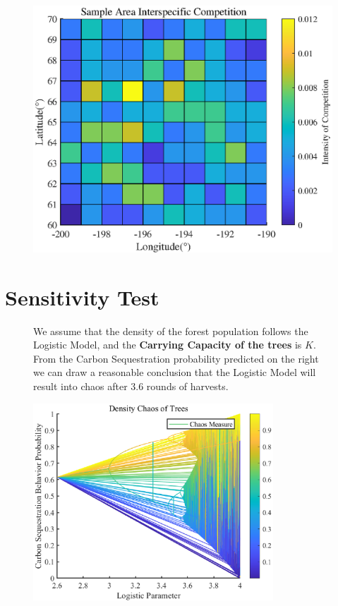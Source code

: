 \documentclass{mcmthesis}
\numberwithin{figure}{section}
\numberwithin{table}{section}
\numberwithin{equation}{section}
\begin{document}
\begin{figure}[htbp]
  \centering
  \includegraphics[width = 12cm]{code&pic/Interspecies-matrix.eps}
\end{figure}


\section{Sensitivity Test}
\begin{figure}[ht]
  \begin{minipage}[htbp]{0.4\linewidth}
    We assume that the density of the forest population follows the Logistic Model,
    and the \textbf{Carrying Capacity of the trees} is $ K $. From the Carbon Sequestration
    probability predicted on the right we can draw a reasonable conclusion that
    the Logistic Model will result into chaos after 3.6 rounds of harvests. 

  \end{minipage}
  \hfill
  \begin{minipage}[htbp]{0.55\linewidth}
    \begin{flushright}
      \includegraphics[width = 9cm]{code&pic/Logistic.eps}
    \end{flushright}
  \end{minipage}
\end{figure}
\end{document}
